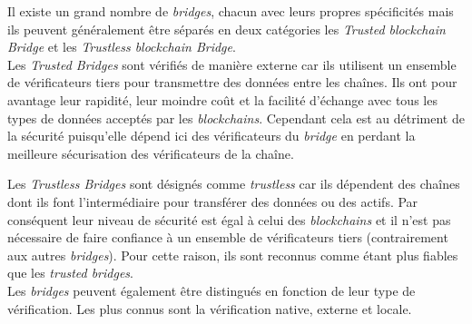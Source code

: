 Il existe un grand nombre de \textit{bridges}, chacun avec leurs propres spécificités mais ils peuvent généralement être séparés en deux catégories les \textit{Trusted \gls{blockchain} Bridge} et les \textit{Trustless \gls{blockchain} Bridge}. \\


Les \textit{Trusted Bridges} sont vérifiés de manière externe car ils utilisent un ensemble de vérificateurs tiers pour transmettre des données entre les chaînes. Ils ont pour avantage leur rapidité, leur moindre coût et la facilité d'échange avec tous les types de données acceptés par les \textit{\gls{blockchain}s}. Cependant cela est au détriment de la sécurité puisqu'elle dépend ici des vérificateurs du \textit{bridge} en perdant la meilleure sécurisation des vérificateurs de la chaîne.\cite{EthereumBridges}

Les \textit{Trustless Bridges} sont désignés comme \textit{trustless} car ils dépendent des chaînes dont ils font l’intermédiaire pour transférer des données ou des \gls{actif}s. Par conséquent leur niveau de sécurité est égal à celui des \textit{\gls{blockchain}s} et il n’est pas nécessaire de faire confiance à un ensemble de vérificateurs tiers (contrairement aux autres \textit{bridges}). Pour cette raison, ils sont reconnus comme étant plus fiables que les \textit{trusted bridges}.\cite{EthereumBridges}\\


 Les \textit{bridges} peuvent également être distingués en fonction de leur type de vérification. Les plus connus sont la vérification native, externe et locale.\cite{InteroperabilityBhuptani} \\

